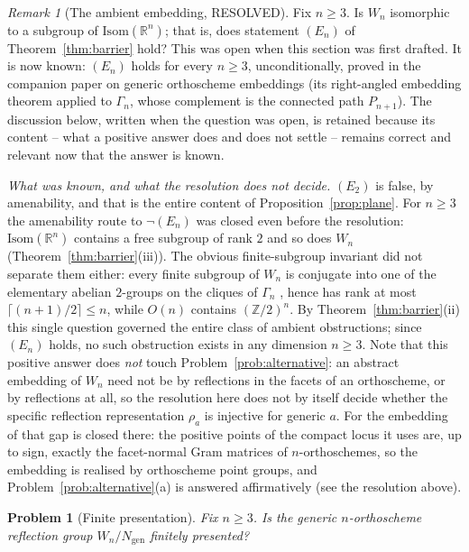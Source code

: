 \documentclass[11pt,a4paper]{article}
\newcommand{\Z}{\mathbb{Z}}
\newcommand{\R}{\mathbb{R}}
\newcommand{\Isom}{\mathrm{Isom}}
\newtheorem{problem}[theorem]{Problem}
\theoremstyle{definition}
\theoremstyle{remark}
\newtheorem{remark}[theorem]{Remark}
\theoremstyle{plain}
\begin{document}
\begin{remark}[The ambient embedding, RESOLVED]\label{prob:embed}
Fix $n\ge3$. Is $W_n$ isomorphic to a subgroup of $\Isom(\R^n)$; that is, does statement
$(E_n)$ of Theorem~\ref{thm:barrier} hold? This was open when this section was first drafted.
It is now known: $(E_n)$ holds for every $n\ge3$, unconditionally, proved in the companion paper
on generic orthoscheme embeddings \cite{Bonfioli3} (its right-angled embedding theorem applied to
$\Gamma_n$, whose complement is the connected path $P_{n+1}$). The discussion below, written when the
question was open, is retained because its content -- what a positive answer does and does not
settle -- remains correct and relevant now that the answer is known.

\emph{What was known, and what the resolution does not decide.} $(E_2)$ is false, by amenability,
and that is the entire content of Proposition~\ref{prop:plane}. For $n\ge3$ the amenability route
to $\neg(E_n)$ was closed even before the resolution: $\Isom(\R^n)$ contains a free subgroup of
rank $2$ and so does $W_n$ (Theorem~\ref{thm:barrier}(iii)). The obvious finite-subgroup invariant
did not separate them either: every finite subgroup of $W_n$ is conjugate into one of the
elementary abelian $2$-groups on the cliques of $\Gamma_n$ \cite{Davis}, hence has rank at most
$\lceil(n+1)/2\rceil\le n$, while $O(n)$ contains $(\Z/2)^n$. By Theorem~\ref{thm:barrier}(ii)
this single question governed the entire class of ambient obstructions; since $(E_n)$ holds, no
such obstruction exists in any dimension $n\ge3$. Note that this positive answer does \emph{not}
touch Problem~\ref{prob:alternative}: an abstract embedding of $W_n$ need not be by reflections in
the facets of an orthoscheme, or by reflections at all, so the resolution here does not by itself
decide whether the specific reflection representation $\rho_a$ is injective for generic $a$. For
the embedding of \cite{Bonfioli3} that gap is closed there: the positive points of the compact
locus it uses are, up to sign, exactly the facet-normal Gram matrices of $n$-orthoschemes, so the
embedding is realised by orthoscheme point groups, and Problem~\ref{prob:alternative}(a) is
answered affirmatively (see the resolution above).
\end{remark}

\begin{problem}[Finite presentation]\label{prob:fp}
Fix $n\ge3$. Is the generic $n$-orthoscheme reflection group $W_n/N_{\mathrm{gen}}$ finitely
presented?
\end{problem}
\end{document}
